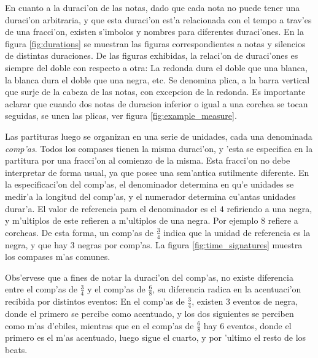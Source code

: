 En cuanto a la duraci'on de las notas, dado que cada nota no puede tener una duraci'on arbitraria, y que esta duraci'on est'a relacionada con el tempo
a trav'es de una fracci'on, existen s'imbolos y nombres para diferentes duraci'ones. 
En la figura \ref{fig:durations} se muestran las figuras correspondientes a notas y silencios de distintas duraciones. De las figuras exhibidas, la relaci'on de duraci'ones
es siempre del doble con respecto a otra: La redonda dura el doble que una blanca, la blanca dura el doble que una negra, etc. 
Se denomina plica, a la barra vertical que surje 
de la cabeza de las notas, con excepcion de la redonda. Es importante aclarar que cuando dos notas de duracion inferior o igual a una corchea se tocan seguidas, 
se unen las plicas, ver figura \ref{fig:example_measure}.

\begin{imagen}
    \width{10cm}
\end{imagen}

Las partituras luego se organizan en una serie de unidades, cada una denominada \emph{comp'as}. Todos los compases tienen la misma duraci'on, y 'esta se especifica
en la partitura por una fracci'on al comienzo de la misma. Esta fracci'on no debe interpretar de forma usual, ya que posee una sem'antica sutilmente diferente.
En la especificaci'on del comp'as, el denominador determina en qu'e unidades se medir'a la longitud del comp'as, y el numerador determina cu'antas unidades 
durar'a. El valor de referencia para el denominador es el $4$ refiriendo a una negra, y m'ultiplos de este refieren a m'ultiplos de una negra. Por ejemplo
$8$ refiere a corcheas.  De esta forma, un comp'as de $\frac{3}{4}$ indica que la unidad de referencia es la negra, y que hay $3$ negras por comp'as.
La figura \ref{fig:time_signatures} muestra los compases m'as comunes. 

\begin{imagen}
    \width{5cm}
\end{imagen}

Obs'ervese que a fines de notar la duraci'on del comp'as, no existe diferencia entre el comp'as de $\frac{3}{4}$ y el comp'as de $\frac{6}{8}$, su diferencia
radica en la acentuaci'on recibida por distintos eventos: En el comp'as de $\frac{3}{4}$, existen 3 eventos de negra, donde el primero se percibe como acentuado, 
y los dos siguientes se perciben como m'as d'ebiles, mientras que en el comp'as de $\frac{6}{8}$ hay 6 eventos, donde el primero es el m'as 
acentuado, luego sigue el cuarto, y por 'ultimo el resto de los beats.

